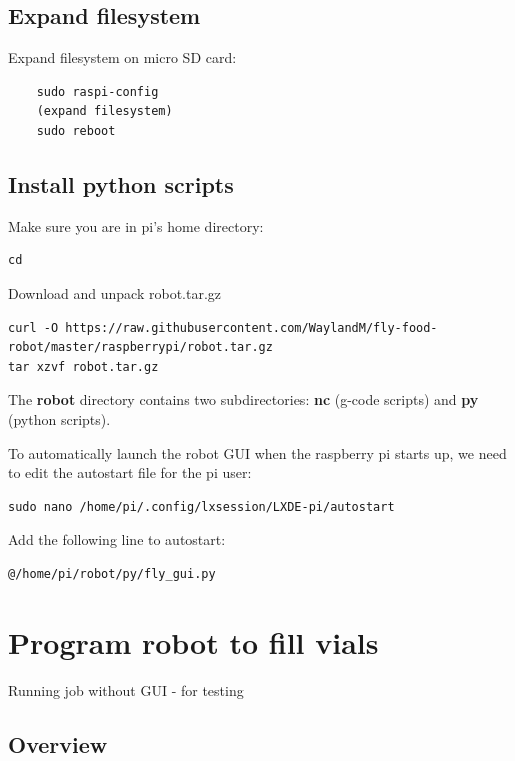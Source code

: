 \documentclass[]{book}
\theoremstyle{definition}
\theoremstyle{definition}
\theoremstyle{remark}
\begin{document}
\section{Expand filesystem}\label{expand-filesystem}

Expand filesystem on micro SD card:

\begin{verbatim}
    sudo raspi-config
    (expand filesystem)
    sudo reboot
\end{verbatim}

\section{Install python scripts}\label{installScripts}

Make sure you are in pi's home directory:

\begin{verbatim}
cd
\end{verbatim}

Download and unpack robot.tar.gz

\begin{verbatim}
curl -O https://raw.githubusercontent.com/WaylandM/fly-food-robot/master/raspberrypi/robot.tar.gz
tar xzvf robot.tar.gz
\end{verbatim}

The \textbf{robot} directory contains two subdirectories: \textbf{nc}
(g-code scripts) and \textbf{py} (python scripts).

To automatically launch the robot GUI when the raspberry pi starts up,
we need to edit the autostart file for the pi user:

\begin{verbatim}
sudo nano /home/pi/.config/lxsession/LXDE-pi/autostart
\end{verbatim}

Add the following line to autostart:

\begin{verbatim}
@/home/pi/robot/py/fly_gui.py
\end{verbatim}

\chapter{Program robot to fill vials}\label{gcode}

Running job without GUI - for testing

\section{Overview}\label{overview-2}
\end{document}
